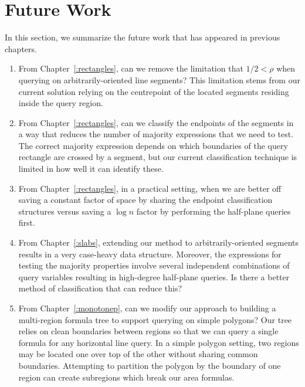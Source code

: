 \section{Future Work}
\label{:conclusion:open-problems}

In this section, we summarize the future work that has appeared in previous chapters.

\begin{enumerate}
\item From Chapter~\ref{:rectangles}, can we remove the limitation that $1/2 < \rho$ when querying on arbitrarily-oriented line segments?  
This limitation stems from our current solution relying on the centrepoint of the located segments residing inside the query region.

\item From Chapter~\ref{:rectangles}, can we classify the endpoints of the segments in a way that reduces the number of majority expressions that we need to test. 
The correct majority expression depends on which boundaries of the query rectangle are crossed by a segment, but our current classification technique is limited in how well it can identify these.

\item From Chapter~\ref{:rectangles}, in a practical setting, when we are better off saving a constant factor of space by sharing the endpoint classification structures versus saving a $\log{n}$ factor by performing the half-plane queries first.

\item From Chapter~\ref{:slabs}, extending our method to arbitrarily-oriented segments results in a very case-heavy data structure. Moreover, the expressions for testing the majority properties involve several independent combinations of query variables resulting in high-degree half-plane queries. Is there a better method of classification that can reduce this?

\item From Chapter~\ref{:monotonep}, can we modify our approach to building a multi-region formula tree to support querying on simple polygons?  Our tree relies on clean boundaries between regions so that we can query a single formula for any horizontal line query. In a simple polygon setting, two regions may be located one over top of the other without sharing common boundaries.  Attempting to partition the polygon by the boundary of one region can create subregions which break our area formulas.

\end{enumerate}
